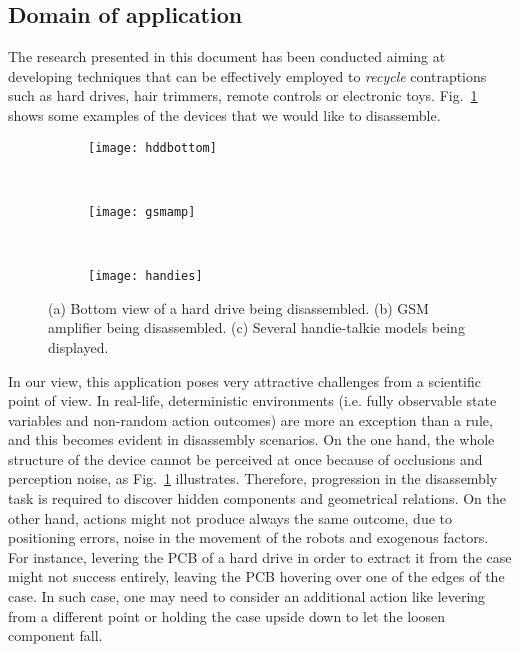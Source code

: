 \documentclass[../root.tex]{subfiles}
\begin{document}
\subsection{Domain of application}

The research presented in this document has been conducted aiming at
developing techniques that can be effectively employed to \emph{recycle}
contraptions such as hard drives, hair trimmers, remote controls or
electronic toys. Fig.~\ref{fig:examples-of-devices} shows some
examples of the devices that we would like to disassemble.

\begin{figure}[tbhp]
	\centering
	\begin{subfigure}[b]{0.31\columnwidth}
		\texttt{[image: hddbottom]}
		\caption{}
	\end{subfigure}
	~
	\begin{subfigure}[b]{0.31\columnwidth}
		\texttt{[image: gsmamp]}
		\caption{}
	\end{subfigure}
	~
	\begin{subfigure}[b]{0.31\columnwidth}
		\texttt{[image: handies]}
		\caption{}
	\end{subfigure}
	\caption{
		(a) Bottom view of a hard drive being disassembled.
		(b) GSM amplifier being disassembled.
		(c) Several handie-talkie models being displayed.
	}
	\label{fig:examples-of-devices}
\end{figure}

In our view, this application poses very attractive challenges
from a scientific point of view. In real-life, deterministic environments
(i.e. fully observable state variables and non-random action outcomes)
are more an exception than a rule, and this becomes evident in disassembly
scenarios. On the one hand, the whole structure of the device cannot be
perceived at once because of occlusions and perception noise, as
Fig.~\ref{fig:examples-of-devices} illustrates. Therefore, progression
in the disassembly task is required to discover hidden components and
geometrical relations. On the other hand, actions might not produce
always the same outcome, due to positioning errors, noise in the movement
of the robots and exogenous factors. For instance, levering the PCB
of a hard drive in order to extract it from the case might not success
entirely, leaving the PCB hovering over one of the edges of the case.
In such case, one may need to consider an additional action like levering
from a different point or holding the case upside down to let the loosen
component fall.
\end{document}
